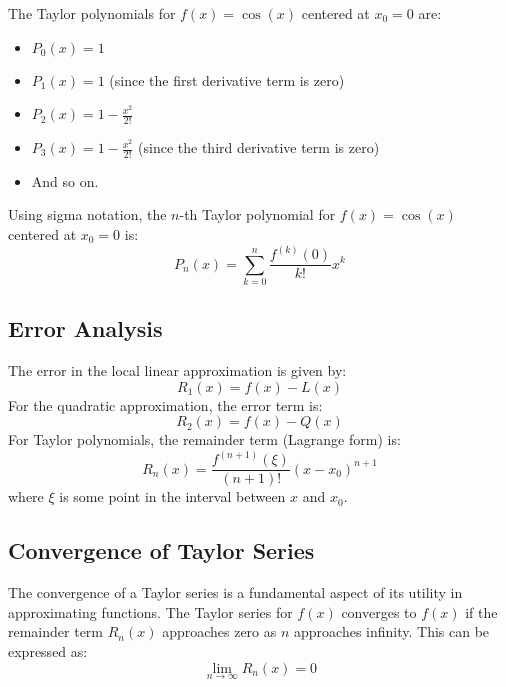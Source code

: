 \documentclass{article}
\begin{document}
The Taylor polynomials for \( f(x) = \cos(x) \) centered at \( x_0 = 0 \) are:
\begin{itemize}
\item \( P_0(x) = 1 \)
\item \( P_1(x) = 1 \) (since the first derivative term is zero)
\item \( P_2(x) = 1 - \frac{x^2}{2!} \)
\item \( P_3(x) = 1 - \frac{x^2}{2!} \) (since the third derivative term is zero)
\item And so on.
\end{itemize}

Using sigma notation, the \( n \)-th Taylor polynomial for \( f(x) = \cos(x) \) centered at \( x_0 = 0 \) is:
\[ P_n(x) = \sum_{k=0}^{n} \frac{f^{(k)}(0)}{k!} x^k \]

\begin{center}
\end{center}

\subsection*{Error Analysis}
The error in the local linear approximation is given by:
\[ R_1(x) = f(x) - L(x) \]
For the quadratic approximation, the error term is:
\[ R_2(x) = f(x) - Q(x) \]
For Taylor polynomials, the remainder term (Lagrange form) is:
\[ R_n(x) = \frac{f^{(n+1)}(\xi)}{(n+1)!}(x - x_0)^{n+1} \]
where \( \xi \) is some point in the interval between \( x \) and \( x_0 \).

\subsection*{Convergence of Taylor Series}
The convergence of a Taylor series is a fundamental aspect of its utility in approximating functions. The Taylor series for \( f(x) \) converges to \( f(x) \) if the remainder term \( R_n(x) \) approaches zero as \( n \) approaches infinity. This can be expressed as:
\[ \lim_{n \to \infty} R_n(x) = 0 \]
\end{document}
